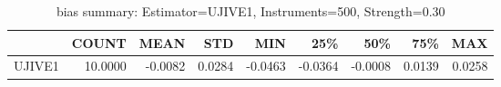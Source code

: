\begin{table}[ht]
\centering
\caption{bias summary: Estimator=UJIVE1, Instruments=500, Strength=0.30}
\begin{tabular}{lrrrrrrrr}
\toprule
 & COUNT & MEAN & STD & MIN & 25\% & 50\% & 75\% & MAX \\
\midrule
UJIVE1 & 10.0000 & -0.0082 & 0.0284 & -0.0463 & -0.0364 & -0.0008 & 0.0139 & 0.0258 \\
\bottomrule
\end{tabular}
\end{table}
